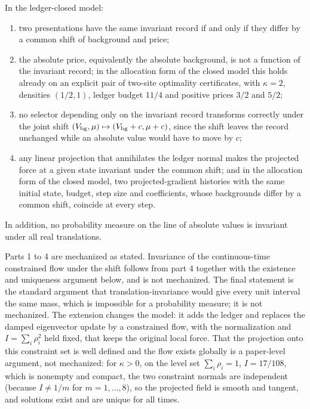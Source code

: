 \begin{theorem}\label{thm:gauge}
In the ledger-closed model:
\begin{enumerate}
\item two presentations have the same invariant record if and only if they differ by a common shift of background and price;
\item the absolute price, equivalently the absolute background, is not a function of the invariant record; in the
allocation form of the closed model this holds already on an explicit pair of two-site optimality certificates, with
$\kappa=2$, densities $(1/2,1)$, ledger budget $11/4$ and positive prices $3/2$ and $5/2$;
\item no selector depending only on the invariant record transforms correctly under the joint shift
$(V_{\rm bg},\mu)\mapsto(V_{\rm bg}+c,\mu+c)$, since the shift leaves the record unchanged while an absolute value would
have to move by $c$;
\item any linear projection that annihilates the ledger normal makes the projected force at a given state invariant under
the common shift; and in the allocation form of the closed model, two projected-gradient histories with the same initial state, budget, step size and
coefficients, whose backgrounds differ by a common shift, coincide at every step.
\end{enumerate}
In addition, no probability measure on the line of absolute values is invariant under all real translations.
\end{theorem}

Parts 1 to 4 are mechanized as stated. Invariance of the continuous-time
constrained flow under the shift follows from part 4 together with the
existence and uniqueness argument below, and is not mechanized. The
final statement is the standard argument that translation-invariance
would give every unit interval the same mass, which is impossible for a
probability measure; it is not mechanized. The extension changes the
model: it adds the ledger and replaces the damped eigenvector update by
a constrained flow, with the normalization and \(I=\sum_i\rho_i^2\) held
fixed, that keeps the original local force. That the projection onto
this constraint set is well defined and the flow exists globally is a
paper-level argument, not mechanized: for \(\kappa>0\), on the level set
\(\sum_i\rho_i=1\), \(I=17/108\), which is nonempty and compact, the two
constraint normals are independent (because \(I\ne1/m\) for
\(m=1,\ldots,8\)), so the projected field is smooth and tangent, and
solutions exist and are unique for all times.

